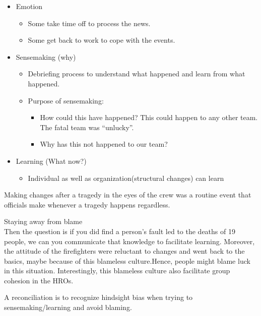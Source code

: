\documentclass[
]{book}
\providecommand{\tightlist}{%
  \setlength{\itemsep}{0pt}\setlength{\parskip}{0pt}}
\begin{document}
\begin{itemize}
\item
  Emotion

  \begin{itemize}
  \tightlist
  \item
    Some take time off to process the news.
  \item
    Some get back to work to cope with the events.
  \end{itemize}
\item
  Sensemaking (why)

  \begin{itemize}
  \item
    Debriefing process to understand what happened and learn from what happened.
  \item
    Purpose of sensemaking:

    \begin{itemize}
    \tightlist
    \item
      How could this have happened? This could happen to any other team. The fatal team was ``unlucky''.
    \item
      Why has this not happened to our team?
    \end{itemize}
  \end{itemize}
\item
  Learning (What now?)

  \begin{itemize}
  \tightlist
  \item
    Individual as well as organization(structural changes) can learn
  \end{itemize}
\end{itemize}

Making changes after a tragedy in the eyes of the crew was a routine event that officials make whenever a tragedy happens regardless.

Staying away from blame\\
Then the question is if you did find a person's fault led to the deaths of 19 people, we can you communicate that knowledge to facilitate learning.
Moreover, the attitude of the firefighters were reluctant to changes and went back to the basics, maybe because of this blameless culture.Hence, people might blame luck in this situation.
Interestingly, this blameless culture also facilitate group cohesion in the HROs.

A reconciliation is to recognize hindsight bias when trying to sensemaking/learning and avoid blaming.
\end{document}
